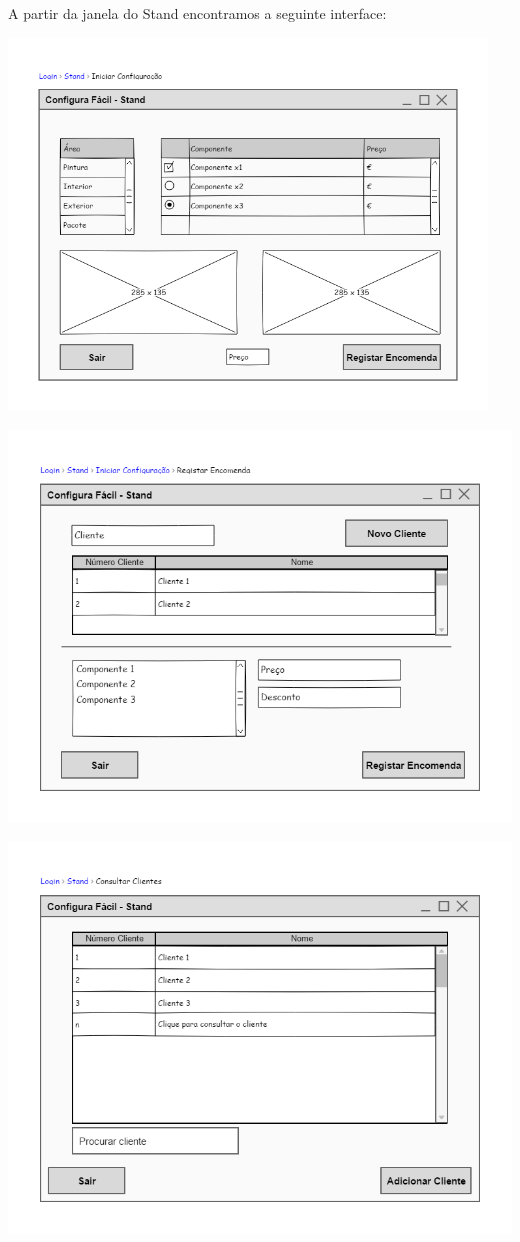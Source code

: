 \documentclass[11pt]{article} %
\begin{document}
A partir da janela do Stand encontramos a seguinte interface:
\begin{center}
 	\includegraphics[width = 5in]{configurao_de_carro.png}

 	\includegraphics[width = 5.5in]{registar_encomenda.png}

 	\includegraphics[width = 5.5in]{consultar_clientes.png}
	

\end{center}
\end{document}
